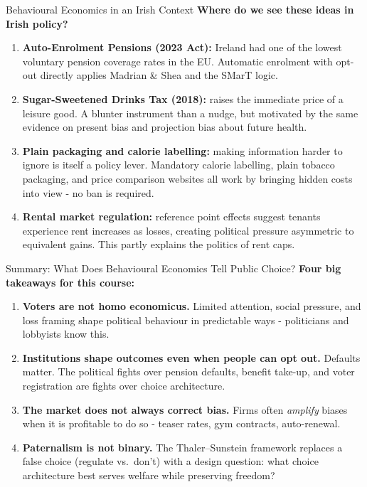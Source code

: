 \documentclass[10pt]{beamer}
\begin{document}
\begin{frame}[allowframebreaks]{Behavioural Economics in an Irish Context}
\textbf{Where do we see these ideas in Irish policy?}


\begin{enumerate}
\item \textbf{Auto-Enrolment Pensions (2023 Act):}
Ireland had one of the lowest voluntary pension coverage rates in the EU.
Automatic enrolment with opt-out directly applies Madrian \& Shea and the SMarT logic.


\item \textbf{Sugar-Sweetened Drinks Tax (2018):}
raises the immediate price of a leisure good.
A blunter instrument than a nudge, but motivated by the same evidence on present bias and projection bias about future health.


\item \textbf{Plain packaging and calorie labelling:} making information harder to ignore is itself a policy lever. Mandatory calorie labelling, plain tobacco packaging, and price comparison websites all work by bringing hidden costs into view - no ban is required.


\item \textbf{Rental market regulation:}
reference point effects suggest tenants experience rent increases as losses, creating political pressure asymmetric to equivalent gains. This partly explains the politics of rent caps.
\end{enumerate}
\end{frame}


\begin{frame}{Summary: What Does Behavioural Economics Tell Public Choice?}
\textbf{Four big takeaways for this course:}


\begin{enumerate}
\item \textbf{Voters are not homo economicus.}
Limited attention, social pressure, and loss framing shape political behaviour in predictable ways - politicians and lobbyists know this.


\item \textbf{Institutions shape outcomes even when people can opt out.}
Defaults matter. The political fights over pension defaults, benefit take-up, and voter registration are fights over choice architecture.


\item \textbf{The market does not always correct bias.}
Firms often \emph{amplify} biases when it is profitable to do so - teaser rates, gym contracts, auto-renewal.


\item \textbf{Paternalism is not binary.}
The Thaler--Sunstein framework replaces a false choice (regulate vs.\ don't) with a design question: what choice architecture best serves welfare while preserving freedom?
\end{enumerate}
\end{frame}
\end{document}
